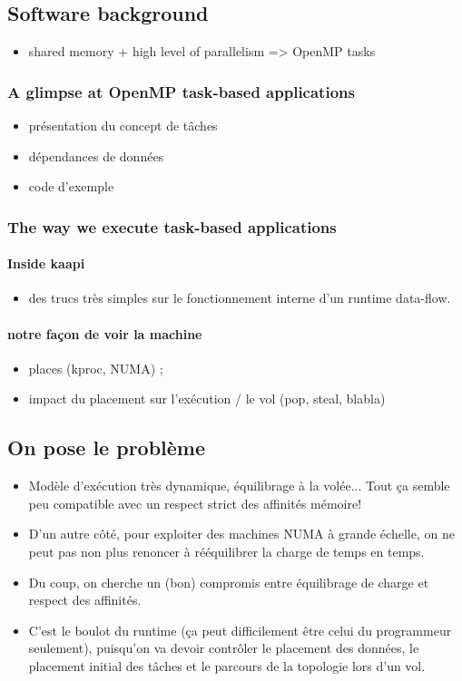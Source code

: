 \documentclass{Styles/llncs}
\begin{document}
\subsection{Software background}
\begin{itemize}
  \item shared memory + high level of parallelism => OpenMP tasks
\end{itemize}
\subsubsection{A glimpse at OpenMP task-based applications}
\begin{itemize}
  \item présentation du concept de tâches
  \item dépendances de données
  \item code d'exemple
\end{itemize}
\subsubsection{The way we execute task-based applications}
\paragraph{Inside kaapi}
\begin{itemize}
\item des trucs très simples sur le fonctionnement interne d'un
  runtime data-flow.
\end{itemize}
\paragraph{notre façon de voir la machine}
\begin{itemize}
\item places (kproc, NUMA) ;
\item impact du placement sur l'exécution / le vol (pop, steal, blabla)
\end{itemize}

\subsection{On pose le problème}
\begin{itemize}
  \item Modèle d'exécution très dynamique, équilibrage à la
    volée... Tout ça semble peu compatible avec un respect strict des
    affinités mémoire!
  \item D'un autre côté, pour exploiter des machines NUMA à grande
    échelle, on ne peut pas non plus renoncer à rééquilibrer la charge
    de temps en temps.
  \item Du coup, on cherche un (bon) compromis entre équilibrage de
    charge et respect des affinités.
  \item C'est le boulot du runtime (ça peut difficilement être celui
    du programmeur seulement), puisqu'on va devoir contrôler le
    placement des données, le placement initial des tâches et le
    parcours de la topologie lors d'un vol.
\end{itemize}
\end{document}
